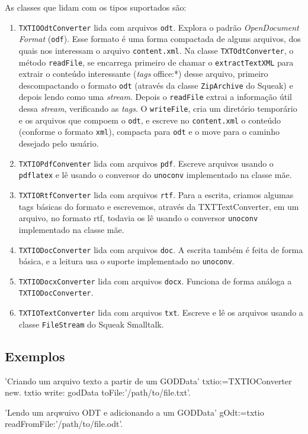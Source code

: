 As classes que lidam com os tipos suportados são:
\begin{enumerate}
\item \verb|TXTIOOdtConverter| lida com arquivos \verb|odt|. Explora o
  padrão \textit{OpenDocument Format} (\verb|odf|). Esse formato é uma
  forma compactada de alguns arquivos, dos quais nos interessam o
  arquivo \verb|content.xml|. Na classe \verb|TXTOdtConverter|, o
  método \verb|readFile|, se encarrega primeiro de chamar o
  \verb|extractTextXML| para extrair o conteúdo interessante
  (\textit{tags} office:*) desse arquivo, primeiro descompactando o
  formato \verb|odt| (através da classe \verb|ZipArchive| do Squeak) e
  depois lendo como uma \textit{stream}. Depois o \verb|readFile|
  extrai a informação útil dessa \textit{stream}, verificando as
  \textit{tags}. O \verb|writeFile|, cria um diretório temporário e os
  arquivos que compoem o \verb|odt|, e escreve no \verb|content.xml| o
  conteúdo (conforme o formato \verb|xml|), compacta para \verb|odt| e
  o move para o caminho desejado pelo usuário.
\item \verb|TXTIOPdfConventer| lida com arquivos \verb|pdf|. Escreve
  arquivos usando o \verb|pdflatex| e lê usando o conversor do
  \verb|unoconv| implementado na classe mãe.
\item \verb|TXTIORtfConverter| lida com arquivos \verb|rtf|. Para a
  escrita, criamos algumas tags básicas do formato e escrevemos,
  através da TXTTextConverter, em um arquivo, no formato rtf, todavia
  os lê usando o conversor \verb|unoconv| implementado na classe mãe.
\item \verb|TXTIODocConverter| lida com arquivos \verb|doc|. A escrita também é feita de forma básica, e a leitura usa o suporte implementado no \verb|unoconv|.
\item \verb|TXTIODocxConverter| lida com arquivos \verb|docx|. Funciona de forma análoga a \verb|TXTIODocConverter|.
\item \verb|TXTIOTextConverter| lida com arquivos \verb|txt|. Escreve
  e lê os arquivos usando a classe \verb|FileStream| do Squeak
  Smalltalk.
\end{enumerate}

\subsection{Exemplos}

\begin{godCode}
'Criando um arquivo texto a partir de um GODData' 
txtio:=TXTIOConverter new.
txtio write: godData toFile:'/path/to/file.txt'.

'Lendo um arqwuivo ODT e adicionando a um GODData'
gOdt:=txtio readFromFile:'/path/to/file.odt'.

\end{godCode}
